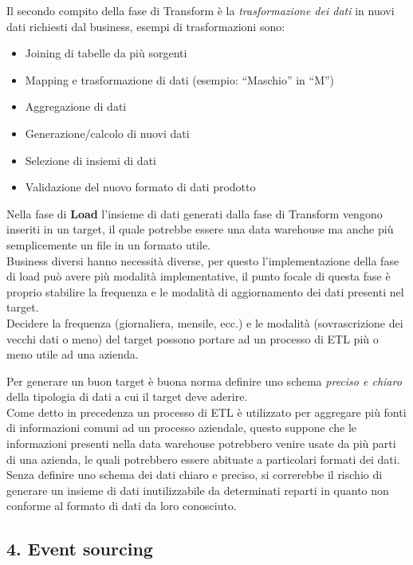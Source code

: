 \documentclass[]{article}
\providecommand{\tightlist}{%
  \setlength{\itemsep}{0pt}\setlength{\parskip}{0pt}}
\begin{document}
Il secondo compito della fase di Transform è la \emph{trasformazione dei
dati} in nuovi dati richiesti dal business, esempi di trasformazioni
sono:

\begin{itemize}
\tightlist
\item
  Joining di tabelle da più sorgenti
\item
  Mapping e trasformazione di dati (esempio: ``Maschio'' in ``M'')
\item
  Aggregazione di dati
\item
  Generazione/calcolo di nuovi dati
\item
  Selezione di insiemi di dati
\item
  Validazione del nuovo formato di dati prodotto
\end{itemize}

Nella fase di \textbf{Load} l'insieme di dati generati dalla fase di
Transform vengono inseriti in un target, il quale potrebbe essere una
data warehouse ma anche più semplicemente un file in un formato utile.\\
Business diversi hanno necessità diverse, per questo l'implementazione
della fase di load può avere più modalità implementative, il punto
focale di questa fase è proprio stabilire la frequenza e le modalità di
aggiornamento dei dati presenti nel target.\\
Decidere la frequenza (giornaliera, mensile, ecc.) e le modalità
(sovrascrizione dei vecchi dati o meno) del target possono portare ad un
processo di ETL più o meno utile ad una azienda.

Per generare un buon target è buona norma definire uno schema
\emph{preciso e chiaro} della tipologia di dati a cui il target deve
aderire.\\
Come detto in precedenza un processo di ETL è utilizzato per aggregare
più fonti di informazioni comuni ad un processo aziendale, questo
suppone che le informazioni presenti nella data warehouse potrebbero
venire usate da più parti di una azienda, le quali potrebbero essere
abituate a particolari formati dei dati.\\
Senza definire uno schema dei dati chiaro e preciso, si correrebbe il
rischio di generare un insieme di dati inutilizzabile da determinati
reparti in quanto non conforme al formato di dati da loro conosciuto.

\newpage

\hypertarget{event-sourcing}{\subsection{4. Event
sourcing}\label{event-sourcing}}
\end{document}
